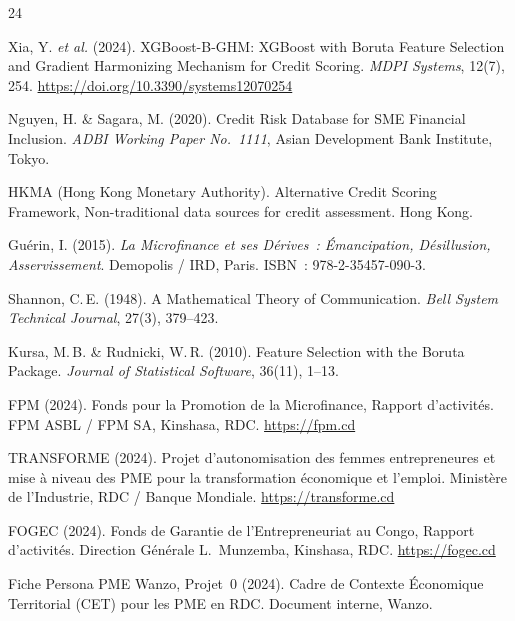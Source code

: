 \documentclass[12pt, a4paper, twocolumn]{article}
\begin{document}
\begin{thebibliography}{24}

Xia, Y. \textit{et al.} (2024).
\newblock XGBoost-B-GHM: XGBoost with Boruta Feature Selection and Gradient Harmonizing Mechanism for Credit Scoring.
\newblock \textit{MDPI Systems}, 12(7), 254.
\newblock \url{https://doi.org/10.3390/systems12070254}

Nguyen, H. \& Sagara, M. (2020).
\newblock Credit Risk Database for SME Financial Inclusion.
\newblock \textit{ADBI Working Paper No.~1111}, Asian Development Bank Institute, Tokyo.

HKMA (Hong Kong Monetary Authority).
\newblock Alternative Credit Scoring Framework, Non-traditional data sources for credit assessment.
\newblock Hong Kong.

Guérin, I. (2015).
\newblock \textit{La Microfinance et ses Dérives~: Émancipation, Désillusion, Asservissement}.
\newblock Demopolis / IRD, Paris.
\newblock ISBN~: 978-2-35457-090-3.

Shannon, C.\,E. (1948).
\newblock A Mathematical Theory of Communication.
\newblock \textit{Bell System Technical Journal}, 27(3), 379--423.

Kursa, M.\,B. \& Rudnicki, W.\,R. (2010).
\newblock Feature Selection with the Boruta Package.
\newblock \textit{Journal of Statistical Software}, 36(11), 1--13.

FPM (2024).
\newblock Fonds pour la Promotion de la Microfinance, Rapport d'activités.
\newblock FPM ASBL / FPM SA, Kinshasa, RDC.
\newblock \url{https://fpm.cd}

TRANSFORME (2024).
\newblock Projet d'autonomisation des femmes entrepreneures et mise à niveau des PME pour la transformation économique et l'emploi.
\newblock Ministère de l'Industrie, RDC / Banque Mondiale.
\newblock \url{https://transforme.cd}

FOGEC (2024).
\newblock Fonds de Garantie de l'Entrepreneuriat au Congo, Rapport d'activités.
\newblock Direction Générale L.~Munzemba, Kinshasa, RDC.
\newblock \url{https://fogec.cd}

Fiche Persona PME Wanzo, Projet~0 (2024).
\newblock Cadre de Contexte Économique Territorial (CET) pour les PME en RDC.
\newblock Document interne, Wanzo.


\end{thebibliography}
\end{document}
